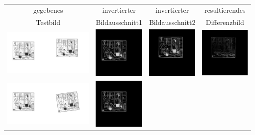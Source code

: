 \documentclass[12pt,german]{article}
\begin{document}
\begin{table}[H]
  \centering
  \begin{tabular}{| c | c | c | c |}
	\hline
	gegebenes & invertierter & invertierter & resultierendes \\	
	Testbild & Bildausschnitt1 & Bildausschnitt2 & Differenzbild \\ 
    \hline
    \includegraphics[width=5cm]{images/autoregister/binary1.jpg} &
    \includegraphics[width=2.5cm]{images/autoregister/binary1FH.jpg} &
    \includegraphics[width=2.5cm]{images/autoregister/binary1SH.jpg} &
    \includegraphics[width=2.5cm]{images/autoregister/binary1DIFF.jpg} \\
    \hline
    \includegraphics[width=5cm]{images/autoregister/binary2.jpg} &
    \includegraphics[width=2.5cm]{images/autoregister/binary2FH.jpg} &

\end{tabular}
\end{table}
\end{document}
